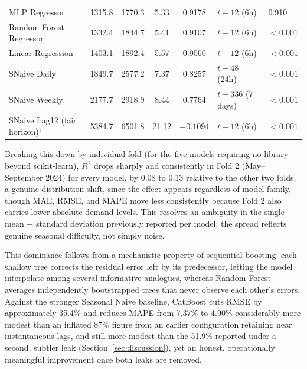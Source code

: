 \documentclass[runningheads]{llncs}
\begin{document}
\begin{table}[H]
{\begin{tabular}{lccccll}
MLP Regressor                     & 1315.8 & 1770.3 & 5.33 & 0.9178 & $t-12$ (6h)      & 0.910 \\
Random Forest Regressor           & 1332.4 & 1844.7 & 5.41 & 0.9107 & $t-12$ (6h)      & $<0.001$ \\
Linear Regression                 & 1403.1 & 1892.4 & 5.57 & 0.9060 & $t-12$ (6h)      & $<0.001$ \\
SNaive Daily                      & 1849.7 & 2577.2 & 7.37 & 0.8257 & $t-48$ (24h)     & $<0.001$ \\
SNaive Weekly                     & 2177.7 & 2918.9 & 8.44 & 0.7764 & $t-336$ (7 days) & $<0.001$ \\
\addlinespace
SNaive Lag12 (fair horizon)$^{\dagger}$ & 5384.7 & 6501.8 & 21.12 & $-0.1094$ & $t-12$ (6h) & $<0.001$ \\
\bottomrule
\end{tabular}%
}
\end{table}

Breaking this down by individual fold (for the five models requiring no library beyond scikit-learn), $R^2$ drops sharply and consistently in Fold 2 (May--September 2024) for every model, by 0.08 to 0.13 relative to the other two folds, a genuine distribution shift, since the effect appears regardless of model family, though MAE, RMSE, and MAPE move less consistently because Fold 2 also carries lower absolute demand levels. This resolves an ambiguity in the single mean $\pm$ standard deviation previously reported per model: the spread reflects genuine seasonal difficulty, not simply noise.

This dominance follows from a mechanistic property of sequential boosting: each shallow tree corrects the residual error left by its predecessor, letting the model interpolate among several informative analogues, whereas Random Forest averages independently bootstrapped trees that never observe each other's errors. Against the stronger Seasonal Naive baseline, CatBoost cuts RMSE by approximately 35.4\% and reduces MAPE from 7.37\% to 4.90\% considerably more modest than an inflated 87\% figure from an earlier configuration retaining near instantaneous lags, and still more modest than the 51.9\% reported under a second, subtler leak (Section~\ref{sec:discussion}), yet an honest, operationally meaningful improvement once both leaks are removed.
\end{document}
